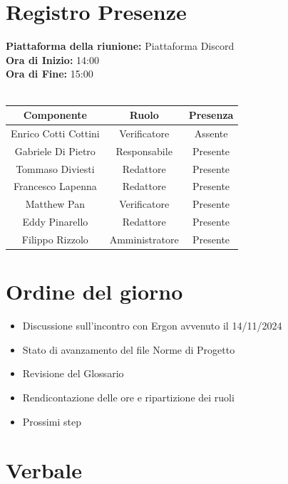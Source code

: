 \documentclass{article}
\begin{document}
\section{Registro Presenze}
\textbf{Piattaforma della riunione:} Piattaforma Discord \\
\textbf{Ora di Inizio:} 14:00\\
\textbf{Ora di Fine:} 15:00\\
\\
\begin{tabular}{|c|c|c|}
    \hline
    \textbf{Componente} & \textbf{Ruolo} & \textbf{Presenza}\\
    \hline
    Enrico Cotti Cottini & Verificatore & Assente \\ 
    \hline
    Gabriele Di Pietro & Responsabile & Presente\\ 
    \hline
    Tommaso Diviesti & Redattore & Presente \\ 
    \hline 
    Francesco Lapenna & Redattore & Presente \\ 
    \hline
    Matthew Pan & Verificatore & Presente\\ 
    \hline 
    Eddy Pinarello & Redattore & Presente \\ 
    \hline 
    Filippo Rizzolo & Amministratore & Presente \\ 
    \hline 
\end{tabular}
\vspace{3cm}
\section{Ordine del giorno}
\begin{itemize} 
    \item Discussione sull'incontro con Ergon avvenuto il 14/11/2024 
    \item Stato di avanzamento del file Norme di Progetto 
    \item Revisione del Glossario 
    \item Rendicontazione delle ore e ripartizione dei ruoli 
    \item Prossimi step 
\end{itemize}

\newpage
\section{Verbale}
\end{document}

